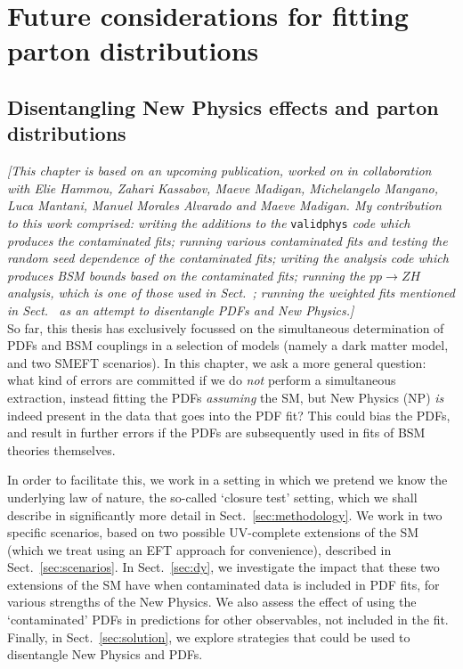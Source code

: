 \documentclass[withindex,glossary]{cam-thesis}
\begin{document}
\newpage
\part{Future considerations for fitting parton distributions}
\chapter{Disentangling New Physics effects and parton distributions}
\label{chap:contamination}

\textit{[This chapter is based on an upcoming publication, worked on in collaboration with Elie Hammou, Zahari Kassabov, Maeve Madigan, Michelangelo Mangano, Luca Mantani, Manuel Morales Alvarado and Maeve Madigan. My contribution to this work comprised: writing the additions to the }\texttt{validphys}\textit{ code which produces the contaminated fits; running various contaminated fits and testing the random seed dependence of the contaminated fits; writing the analysis code which produces BSM bounds based on the contaminated fits; running the $pp \rightarrow ZH$ analysis, which is one of those used in Sect.~\ref{}; running the weighted fits mentioned in Sect.~\ref{} as an attempt to disentangle PDFs and New Physics.]}\\

\noindent So far, this thesis has exclusively focussed on the simultaneous determination of PDFs
and BSM couplings in a selection of models (namely a dark matter model, and two SMEFT scenarios). 
In this chapter, we ask a more general question: what kind of errors are committed if we do \textit{not} 
perform a simultaneous extraction, instead fitting the PDFs \textit{assuming} the SM,
but New Physics (NP) \textit{is} indeed present in the data that goes into the PDF fit? This could bias the
PDFs, and result in further errors if the PDFs are subsequently used in fits of BSM theories themselves. 

In order to facilitate this, we work in a setting in which we pretend
we know the underlying law of nature, the so-called `closure test' setting, which we shall describe in 
significantly more detail in Sect.~\ref{sec:methodology}. We work in two specific scenarios, based 
on two possible UV-complete extensions of the SM (which we treat using an EFT approach for 
convenience), described in Sect.~\ref{sec:scenarios}. In Sect.~\ref{sec:dy}, we investigate the impact
that these two extensions of the SM have when contaminated data is included in PDF fits, for various strengths of the New Physics.
We also assess the effect of using the `contaminated' PDFs
in predictions for other observables, not included in the fit.
Finally, in Sect.~\ref{sec:solution}, we explore strategies that could be used to disentangle New Physics
and PDFs. 
\end{document}
